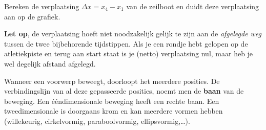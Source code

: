 \documentclass{ximera}
\begin{document}
\begin{image}
\end{image}

\begin{quickquestion*}{}{}
	Bereken de verplaatsing \(\Delta x = x_4 - x_1\) van de zeilboot en duidt deze verplaatsing aan op de grafiek.  
\end{quickquestion*}


\textbf{Let op}, de verplaatsing hoeft niet noodzakelijk gelijk te zijn aan de \emph{afgelegde weg} tussen de twee bijbehorende tijdstippen. 
Als je een rondje hebt gelopen op de atletiekpiste en terug aan start staat is je (netto) verplaatsing nul, maar heb je wel degelijk afstand afgelegd.


Wanneer een voorwerp beweegt, doorloopt het meerdere posities. 
De verbindingslijn van al deze gepasseerde posities, noemt men de \textbf{baan} van de beweging. 
Een ééndimensionale beweging heeft een rechte baan. 
Een tweedimensionale is doorgaans krom en kan meerdere vormen hebben (willekeurig, cirkelvormig, paraboolvormig, ellipsvormig,\ldots). 
\end{document}
